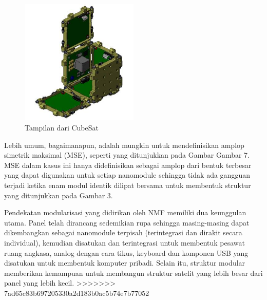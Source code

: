    \begin{figure}[ht]
\centerline{\includegraphics[width=0.5\textwidth]{figures/ViewofCubeSat.png}}
  \caption{Tampilan dari CubeSat}
  \label{ViewofCubeSat}
  \end{figure}

Lebih umum, bagaimanapun, adalah mungkin untuk mendefinisikan amplop simetrik maksimal (MSE), seperti yang ditunjukkan pada Gambar Gambar 7. MSE dalam kasus ini hanya didefinisikan sebagai amplop dari bentuk terbesar yang dapat digunakan untuk setiap nanomodule sehingga tidak ada gangguan terjadi ketika enam modul identik dilipat bersama untuk membentuk struktur yang ditunjukkan pada Gambar 3.

Pendekatan modularisasi yang didirikan oleh NMF memiliki dua keunggulan utama. Panel telah dirancang sedemikian rupa sehingga masing-masing dapat dikembangkan sebagai nanomodule terpisah (terintegrasi dan dirakit secara individual), kemudian disatukan dan terintegrasi untuk membentuk pesawat ruang angkasa, analog dengan cara tikus, keyboard dan komponen USB yang disatukan untuk membentuk komputer pribadi. Selain itu, struktur modular memberikan kemampuan untuk membangun struktur satelit yang lebih besar dari panel yang lebih kecil.
>>>>>>> 7ad65c83b697205330a2d183b0ac5b74e7b77052
